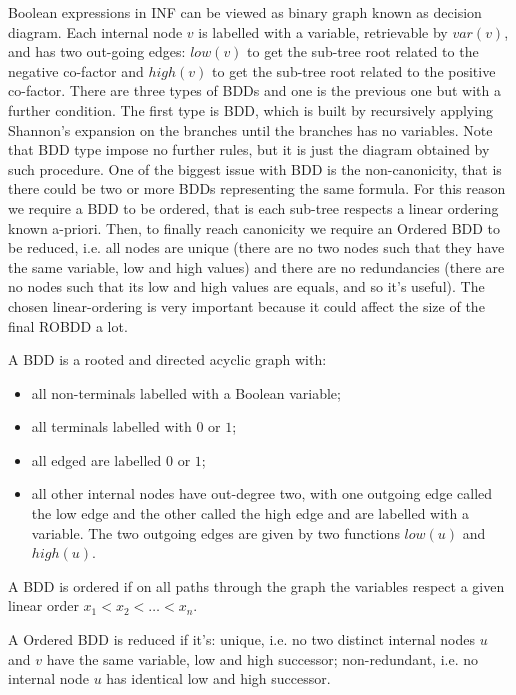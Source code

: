 Boolean expressions in INF can be viewed as binary graph known as decision diagram. Each internal node $v$ is labelled with a variable, retrievable by $var(v)$, and has two out-going edges: $low(v)$ to get the sub-tree root related to the negative co-factor and $high(v)$ to get the sub-tree root related to the positive co-factor.
There are three types of BDDs and one is the previous one but with a further condition. 
The first type is BDD, which is built by recursively applying Shannon's expansion on the branches until the branches has no variables. 
Note that BDD type impose no further rules, but it is just the diagram obtained by such procedure. 
One of the biggest issue with BDD is the non-canonicity, that is there could be two or more BDDs representing the same formula.
For this reason we require a BDD to be ordered, that is each sub-tree respects a linear ordering known a-priori. 
Then, to finally reach canonicity we require an Ordered BDD to be reduced, i.e. all nodes are unique (there are no two nodes such that they have the same variable, low and high values) and there are no redundancies (there are no nodes such that its low and high values are equals, and so it's useful). 
The chosen linear-ordering is very important because it could affect the size of the final ROBDD a lot.

\begin{definition}
A BDD is a rooted and directed acyclic graph with: 
\begin{itemize}
    \item all non-terminals labelled with a Boolean variable;
    \item all terminals labelled with $0$ or $1$;
    \item all edged are labelled $0$ or $1$;
    \item all other internal nodes have out-degree two, with one outgoing edge called the low edge and the other called the high edge and are labelled with a variable. The two outgoing edges are given by two functions $low(u)$ and $high(u)$. 
\end{itemize}
\end{definition}

\begin{definition}
A BDD is ordered if on all paths through the graph the variables respect a given linear order $x_1 < x_2 < \dots < x_n$.
\end{definition}

\begin{definition}
A Ordered BDD is reduced if it's: unique, i.e. no two distinct internal nodes $u$ and $v$ have the same variable, low and high successor; non-redundant, i.e. no internal node $u$ has identical low and high successor.
\end{definition}


